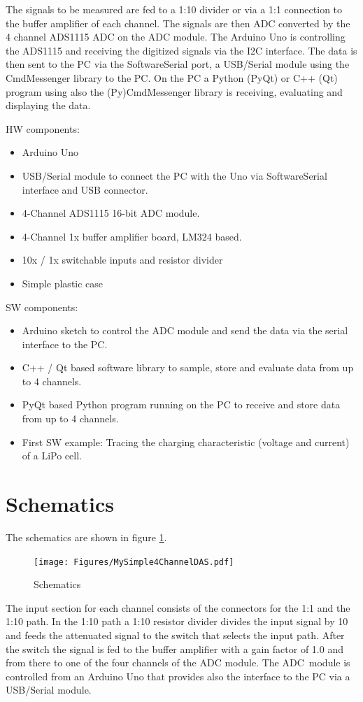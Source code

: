 \documentclass[11pt, oneside]{scrartcl}   	%
\begin{document}
The signals to be measured are fed to a 1:10 divider or via a 1:1 connection to the buffer amplifier of each channel.
The signals are then ADC converted by the 4 channel ADS1115 ADC on the ADC module.
The Arduino Uno is controlling the ADS1115 and receiving the digitized signals via the I2C interface.
The data is then sent to the PC via the SoftwareSerial port, a USB/Serial module using the CmdMessenger library to the PC.
On the PC a Python (PyQt) or C++ (Qt) program using also the (Py)CmdMessenger library is receiving, evaluating and displaying the data.

HW components:
\begin{itemize}
	\item Arduino Uno
	\item USB/Serial module to connect the PC with the Uno via SoftwareSerial interface and USB connector.
	\item 4-Channel ADS1115 16-bit ADC module.
	\item 4-Channel 1x buffer amplifier board, LM324 based.
	\item 10x / 1x switchable inputs and resistor divider 
	\item Simple plastic case
\end{itemize}

SW components:
\begin{itemize}
	\item Arduino sketch to control the ADC module and send the data via the serial interface to the PC.
	\item C++ / Qt based software library to sample, store and evaluate data from up to 4 channels.
	\item PyQt based Python program running on the PC to receive and store data from up to 4 channels.
	\item First SW example: Tracing the charging characteristic (voltage and current) of a LiPo cell.
\end{itemize}

\newpage
\section{Schematics}
The schematics are shown in figure \ref{fig:Schematics}.
\begin{figure}[htbp]
	\centering
	\texttt{[image: Figures/MySimple4ChannelDAS.pdf]}
	\caption[Schematics]{Schematics}
	\label{fig:Schematics}
\end{figure}
The input section for each channel consists of the connectors for the 1:1 and the 1:10 path. In the 1:10 path a 1:10 resistor divider divides the input signal
by 10 and feeds the attenuated signal to the switch that selects the input path. After the switch the signal is fed to the buffer amplifier with a gain factor of 1.0 and from there to one of the four channels of the ADC module.
The ADC module is controlled from an Arduino Uno that provides also the interface to the PC via a USB/Serial module.
\end{document}
